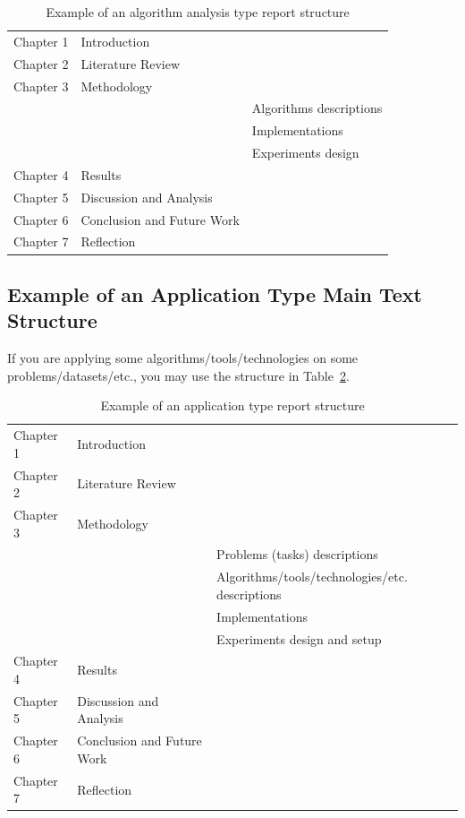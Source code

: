 \begin{table}[!ht]
    \centering
    \caption{Example of an algorithm analysis type report structure}
    \label{tab:algo_temp}
    \begin{tabular}{lll}
        \toprule
        Chapter 1 & Introduction  &    \\
        Chapter 2 & Literature Review  &    \\
        Chapter 3 & Methodology   &    \\
        &               & Algorithms descriptions  \\
        &               & Implementations   \\
        &               & Experiments design   \\
        Chapter 4 & Results       &  \\
        Chapter 5 & Discussion and Analysis  &    \\
        Chapter 6 & Conclusion and Future Work  &    \\
        Chapter 7 & Reflection  &    \\
        \bottomrule
    \end{tabular}
\end{table}

\subsection{Example of an Application Type Main Text Structure}
\label{subsec:app_struct}
If you are applying some algorithms/tools/technologies on some 
problems/datasets/etc., you may use the structure in Table~\ref{tab:app_temp}.

\begin{table}[!ht]
    \centering
    \caption{Example of an application type report structure}
    \label{tab:app_temp}
    \begin{tabular}{lll}
        \toprule
        Chapter 1 & Introduction  &    \\
        Chapter 2 & Literature Review  &    \\
        Chapter 3 & Methodology   &    \\
        &               & Problems (tasks) descriptions  \\
        &               & Algorithms/tools/technologies/etc. descriptions  \\
        &               & Implementations   \\
        &               & Experiments design and setup   \\
        Chapter 4 & Results       &  \\
        Chapter 5 & Discussion and Analysis  &    \\
        Chapter 6 & Conclusion and Future Work  &    \\
        Chapter 7 & Reflection  &    \\
        \bottomrule
    \end{tabular}
\end{table}

